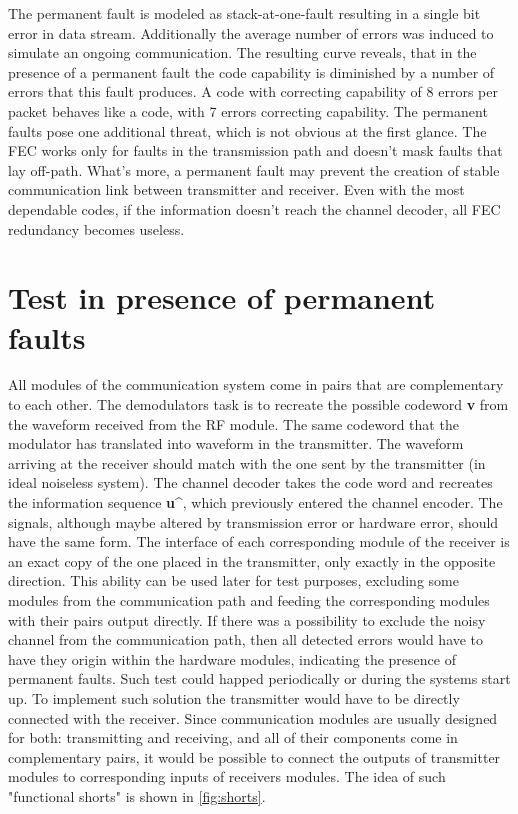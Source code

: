 The permanent fault is modeled as stack-at-one-fault resulting in a single bit error in data stream. Additionally the average number of errors was induced to simulate an ongoing communication. The resulting curve reveals, that in the presence of a permanent fault the code capability is diminished by a number of errors that this fault produces. A code with correcting capability of 8 errors per packet behaves like a code, with 7 errors correcting capability. The permanent faults pose one additional threat, which is not obvious at the first glance. The FEC works only for faults in the transmission path and doesn't mask faults that lay off-path. What's more, a permanent fault may prevent the creation of stable communication link between transmitter and receiver. Even with the most dependable codes, if the information doesn't reach the channel decoder, all FEC redundancy becomes useless.

\section{Test in presence of permanent faults}
All modules of the communication system come in pairs that are complementary to each other. The demodulators task is to recreate the possible codeword \textbf{v} from the waveform received from the RF module. The same codeword that the modulator has translated into waveform in the transmitter. The waveform arriving at the receiver should match with the one sent by the transmitter (in ideal noiseless system). The channel decoder takes the code word and recreates the information sequence \textbf{u\^}, which previously entered the channel encoder. The signals, although maybe altered by transmission error or hardware error, should have the same form. The interface of each corresponding module of the receiver is an exact copy of the one placed in the transmitter, only exactly in the opposite direction. This ability can be used later for test purposes, excluding some modules from the communication path and feeding the corresponding modules with their pairs output directly.
If there was a possibility to exclude the noisy channel from the communication path, then all detected errors would have to have they origin within the hardware modules, indicating the presence of permanent faults. Such test could happed periodically or during the systems start up.
To implement such solution the transmitter would have to be directly connected with the receiver. Since communication modules are usually designed for both: transmitting and receiving, and all of their components come in complementary pairs, it would be possible to connect the outputs of transmitter modules to corresponding inputs of receivers modules. The idea of such "functional shorts" is shown in \autoref{fig:shorts}.
